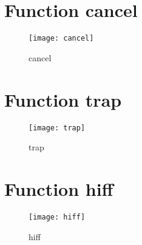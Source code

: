 \newpage

\section{Function cancel}

\begin{center}

\end{center}

\begin{center}

\end{center}

\begin{figure}[h]
\begin{center}
\texttt{[image: cancel]}
\caption{cancel}
\end{center}
\end{figure}

\newpage

\section{Function trap}

\begin{center}

\end{center}

\begin{center}

\end{center}

\begin{figure}[h]
\begin{center}
\texttt{[image: trap]}
\caption{trap}
\end{center}
\end{figure}

\newpage

\section{Function hiff}

\begin{center}

\end{center}

\begin{center}

\end{center}

\begin{figure}[h]
\begin{center}
\texttt{[image: hiff]}
\caption{hiff}
\end{center}
\end{figure}

